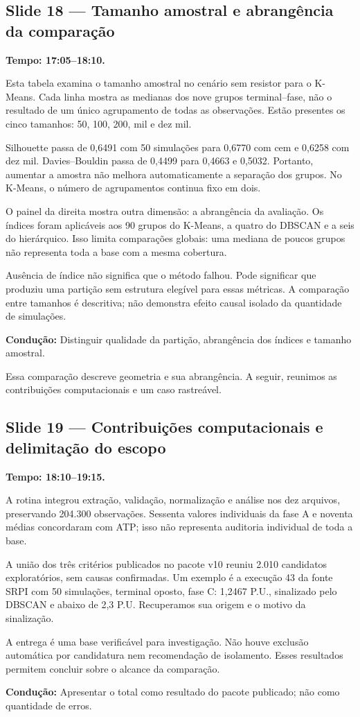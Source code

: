 \documentclass[11pt,a4paper]{article}
\newcommand{\slide}[3]{\Needspace{8\baselineskip}
  \subsection*{Slide #1 --- #2}
  \textbf{Tempo: #3.}\par}
\newcommand{\cue}[1]{\par{\small\color{accent}\textbf{Condução:} #1}\par}
\begin{document}
\slide{18}{Tamanho amostral e abrangência da comparação}{17:05--18:10}
Esta tabela examina o tamanho amostral no cenário sem resistor para o
K-Means. Cada linha mostra as medianas dos nove grupos terminal--fase,
não o resultado de um único agrupamento de todas as observações.
Estão presentes os cinco tamanhos: 50, 100, 200, mil e dez mil.

Silhouette passa de 0,6491 com 50 simulações para 0,6770 com cem e
0,6258 com dez mil. Davies--Bouldin passa de 0,4499 para 0,4663 e
0,5032. Portanto, aumentar a amostra não melhora automaticamente a
separação dos grupos. No K-Means, o número de agrupamentos continua fixo
em dois.

O painel da direita mostra outra dimensão: a abrangência da avaliação. Os índices foram
aplicáveis aos 90 grupos do K-Means, a quatro do DBSCAN e a seis do
hierárquico. Isso limita comparações globais: uma mediana de poucos
grupos não representa toda a base com a mesma cobertura.

Ausência de índice não significa que o método falhou. Pode significar
que produziu uma partição sem estrutura elegível para essas métricas.
A comparação entre tamanhos é descritiva; não demonstra efeito causal
isolado da quantidade de simulações.
\cue{Distinguir qualidade da partição, abrangência dos índices e tamanho amostral.}

Essa comparação descreve geometria e sua abrangência. A seguir, reunimos as contribuições computacionais e um caso rastreável.


\slide{19}{Contribuições computacionais e delimitação do escopo}{18:10--19:15}
A rotina integrou extração, validação, normalização e análise nos dez arquivos, preservando 204.300 observações. Sessenta valores individuais da fase A e noventa médias concordaram com ATP; isso não representa auditoria individual de toda a base.

A união dos três critérios publicados no pacote v10 reuniu 2.010 candidatos exploratórios, sem causas confirmadas. Um exemplo é a execução 43 da fonte SRPI com 50 simulações, terminal oposto, fase C: 1,2467 P.U., sinalizado pelo DBSCAN e abaixo de 2,3 P.U. Recuperamos sua origem e o motivo da sinalização.

A entrega é uma base verificável para investigação. Não houve exclusão automática por candidatura nem recomendação de isolamento. Esses resultados permitem concluir sobre o alcance da comparação.
\cue{Apresentar o total como resultado do pacote publicado; não como quantidade de erros.}
\end{document}
